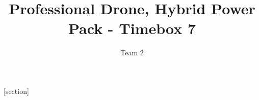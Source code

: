 

\title{Professional Drone, Hybrid Power Pack  - Timebox 7}
\author{Team 2}






[section]\setcounter{udrboks}{0}
\renewcommand{\theudrboks}{\arabic{section}.\arabic{udrboks}}
\renewcommand{\theudrboks}{\arabic{udrboks}}
\newenvironment{udrboks}[2][]{%
  \refstepcounter{udrboks}%
  \ifstrempty{#1}%
  {\mdfsetup{%
      frametitle={%
        \tikz[baseline=(current bounding box.east),outer sep=0pt]
        \node[anchor=east,rectangle,fill=blue!20]
        {\strut Udregninger~\theudrboks};}}
  }%
  {\mdfsetup{%
      frametitle={%
        \tikz[baseline=(current bounding box.east),outer sep=0pt]
        \node[anchor=east,rectangle,fill=blue!20]
        {\strut Udregninger ~\theudrboks:~#1};}}%
  }%
  \mdfsetup{innertopmargin=10pt,linecolor=blue!20,%
    linewidth=2pt,topline=true,%
    frametitleaboveskip=\dimexpr-\ht\strutbox\relax
  }
  \begin{mdframed}[]\relax%
    \label{#2}}{\end{mdframed}}


